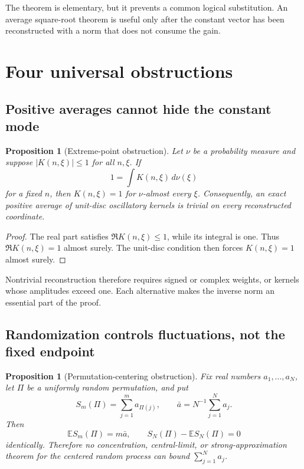 \documentclass[11pt]{amsart}
\numberwithin{equation}{section}
\theoremstyle{plain}
\newtheorem{proposition}[theorem]{Proposition}
\theoremstyle{definition}
\theoremstyle{remark}
\newcommand{\E}{\mathbb E}
\begin{document}
The theorem is elementary, but it prevents a common logical substitution.
An average square-root theorem is useful only after the constant vector has
been reconstructed with a norm that does not consume the gain.

\section{Four universal obstructions}\label{sec:universal}

\subsection{Positive averages cannot hide the constant mode}

\begin{proposition}[Extreme-point obstruction]\label{prop:positive}
Let \(\nu\) be a probability measure and suppose
\(|K(n,\xi)|\leq1\) for all \(n,\xi\).  If
\begin{equation}\label{eq:positive-average}
  1=\int K(n,\xi)\,d\nu(\xi)
\end{equation}
for a fixed \(n\), then \(K(n,\xi)=1\) for \(\nu\)-almost every \(\xi\).
Consequently, an exact positive average of unit-disc oscillatory kernels is
trivial on every reconstructed coordinate.
\end{proposition}

\begin{proof}
The real part satisfies \(\Re K(n,\xi)\leq1\), while its integral is one.
Thus \(\Re K(n,\xi)=1\) almost surely.  The unit-disc condition then forces
\(K(n,\xi)=1\) almost surely.
\end{proof}

Nontrivial reconstruction therefore requires signed or complex weights, or
kernels whose amplitudes exceed one.  Each alternative makes the inverse norm
an essential part of the proof.

\subsection{Randomization controls fluctuations, not the fixed endpoint}

\begin{proposition}[Permutation-centering obstruction]\label{prop:permutation}
Fix real numbers \(a_1,\ldots,a_N\), let \(\Pi\) be a uniformly random
permutation, and put
\begin{equation}\label{eq:permuted-sum}
  S_m(\Pi)=\sum_{j=1}^{m}a_{\Pi(j)},
  \qquad \bar a=N^{-1}\sum_{j=1}^{N}a_j.
\end{equation}
Then
\begin{equation}\label{eq:permutation-mean}
  \E S_m(\Pi)=m\bar a,
  \qquad
  S_N(\Pi)-\E S_N(\Pi)=0
\end{equation}
identically.  Therefore no concentration, central-limit, or strong-approximation
theorem for the centered random process can bound \(\sum_{j=1}^{N}a_j\).
\end{proposition}
\end{document}
